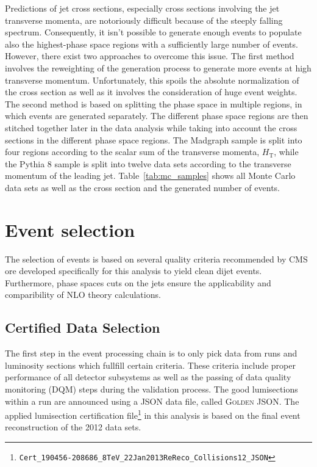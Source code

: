 Predictions of jet cross sections, especially cross sections involving the jet
transverse momenta, are notoriously difficult because of the steeply falling
spectrum. Consequently, it isn't possible to generate enough events to populate
also the highest-\pt phase space regions with a sufficiently large number of
events. However, there exist two approaches to overcome this issue. The first
method involves the reweighting of the generation process to generate more
events at high transverse momentum. Unfortunately, this spoils the absolute
normalization of the cross section as well as it involves the consideration of
huge event weights. The second method is based on splitting the phase space in
multiple regions, in which events are generated separately. The
different phase space regions are then stitched together later in the data
analysis while taking into account the cross sections in the different phase
space regions. The Madgraph sample is split into four regions according to the
scalar sum of the transverse momenta, $H_{\mathrm{T}}$, while the Pythia 8
sample is split into twelve data sets according to the transverse momentum of
the leading jet. Table~\ref{tab:mc_samples} shows all Monte Carlo data sets
as well as the cross section and the generated number of events.

\section{Event selection}
\label{sec:event_selection}

The selection of events is based on several quality criteria recommended by CMS
ore developed specifically for this analysis to yield clean dijet events.
Furthermore, phase spaces cuts on the jets ensure the applicability and comparibility of NLO
theory calculations.

\subsection{Certified Data Selection}

The first step in the event processing chain is to only pick data from runs and
luminosity sections which fullfill certain criteria. These criteria include
proper performance of all detector subsystems as well as the passing of data
quality monitoring (DQM) steps during the validation process. The good
lumisections within a run are announced using a JSON data file, called
\textsc{Golden JSON}. The applied lumisection certification
file\footnote{\texttt{Cert\_190456-208686\_8TeV\_22Jan2013ReReco\_Collisions12\_JSON}}
in this analysis is based on the final event reconstruction of the 2012 data
sets.

